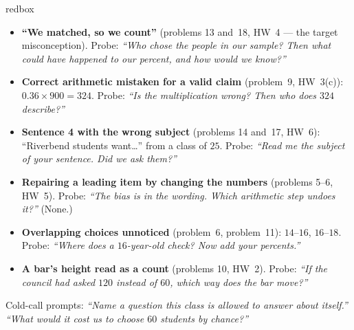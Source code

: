 \documentclass[10pt]{article}
\begin{document}
\boxguard
\begin{skillbox}{redbox}
\begin{itemize}[leftmargin=1.2em, nosep]
  \item \textbf{``We matched, so we count''} (problems 13 and~18, HW~4 --- the target
        misconception). Probe: \emph{``Who chose the people in our sample? Then what could have
        happened to our percent, and how would we know?''}
  \item \textbf{Correct arithmetic mistaken for a valid claim} (problem~9, HW~3(c)):
        $0.36 \times 900 = 324$. Probe: \emph{``Is the multiplication wrong? Then who does $324$
        describe?''}
  \item \textbf{Sentence 4 with the wrong subject} (problems 14 and~17, HW~6): ``Riverbend
        students want\ldots'' from a class of $25$. Probe: \emph{``Read me the subject of your
        sentence. Did we ask them?''}
  \item \textbf{Repairing a leading item by changing the numbers} (problems 5--6, HW~5). Probe:
        \emph{``The bias is in the wording. Which arithmetic step undoes it?''} (None.)
  \item \textbf{Overlapping choices unnoticed} (problem~6, problem~11): $14$--$16$, $16$--$18$.
        Probe: \emph{``Where does a $16$-year-old check? Now add your percents.''}
  \item \textbf{A bar's height read as a count} (problems 10, HW~2). Probe: \emph{``If the council
        had asked $120$ instead of $60$, which way does the bar move?''}
\end{itemize}
Cold-call prompts: \emph{``Name a question this class is allowed to answer about itself.''}
\quad \emph{``What would it cost us to choose $60$ students by chance?''}
\end{skillbox}
\end{document}
